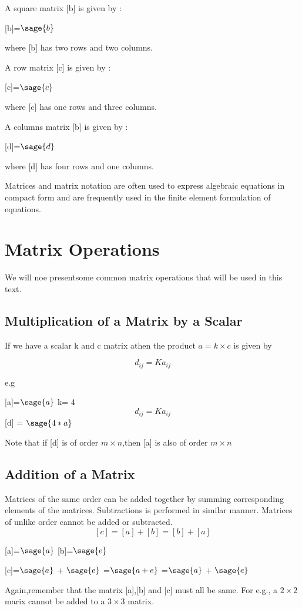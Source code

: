 \documentclass[12pt]{report}
\begin{document}
A square matrix [b] is given by :
\begin{center}
[b]=$\sage{b}$
\end{center}

where [b] has two rows and two columns.

A row matrix [c] is given by :
\begin{center}
[c]=$\sage{c}$
\end{center}

where [c] has one rows and three columns.

A columns matrix [b] is given by :
\begin{center}
[d]=$\sage{d}$
\end{center}

where [d] has four rows and one columns.

Matrices and matrix notation are often used to express algebraic equations in compact form and are frequently used in the finite element formulation of equations.
\section{Matrix Operations}
We will noe presentsome common matrix operations that will be used in this text.
\subsection{Multiplication of a Matrix by a Scalar}
If we have a scalar k and c matrix athen the product $a = k \times c $ is given by
\begin{center}
\[d_{{ij}} = Ka_{{ij}}\]
\end{center}
e.g
\begin{center}
[a]=$\sage{a}$
k= 4\\
\[d_{{ij}} = Ka_{{ij}}\]
[d] = $\sage{4*a}$
\end{center}
Note that if [d] is of order $ m \times n $,then [a] is also of order $ m \times n $
\subsection{Addition of a Matrix}
Matrices of the same order can be added together by summing corresponding elements of the matrices. Subtractions is performed in similar manner. Matrices of unlike order cannot be added or subtracted.
\[ [c]=[a]+[b]= [b]+[a] \]
\begin{center}

[a]=$\sage{a}$
[b]=$\sage{e}$


[c]=$\sage{a}$ + $\sage{e}$
=$\sage{a+e}$
=$\sage{a}$ + $\sage{e}$
\end{center}
Again,remember that the matrix [a],[b] and [c] must all be same. For e.g., a $ 2 \times 2 $ marix cannot be added to a $ 3 \times 3 $ matrix.
\end{document}
